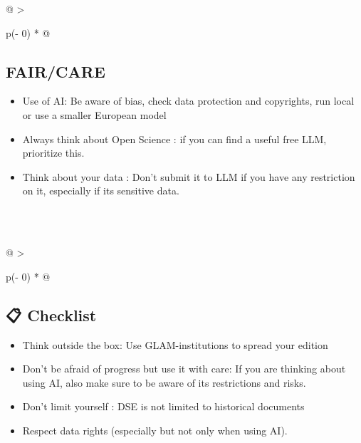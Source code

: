 \documentclass[
  letterpaper,
  DIV=11,
  numbers=noendperiod]{scrreprt}
\begin{document}
\begin{longtable}[]{@{}
  >{\raggedright\arraybackslash}p{(\columnwidth - 0\tabcolsep) * }@{}}
\toprule\noalign{}
\begin{minipage}[b]{\linewidth}\raggedright
\subsection{\texorpdfstring{\textbf{FAIR/CARE}}{FAIR/CARE}}\label{faircare-1}

\begin{itemize}
\item
  Use of AI: Be aware of bias, check data protection and copyrights, run
  local or use a smaller European model
\item
  Always think about Open Science : if you can find a useful free LLM,
  prioritize this.
\item
  Think about your data : Don't submit it to LLM if you have any
  restriction on it, especially if its sensitive data.
\end{itemize}
\end{minipage} \\
\midrule\noalign{}
\endhead
\bottomrule\noalign{}
\endlastfoot
 \\
\end{longtable}

\begin{longtable}[]{@{}
  >{\raggedright\arraybackslash}p{(\columnwidth - 0\tabcolsep) * }@{}}
\toprule\noalign{}
\begin{minipage}[b]{\linewidth}\raggedright
\subsection{\texorpdfstring{\textbf{📋
Checklist}}{📋 Checklist}}\label{checklist-1}

\begin{itemize}
\item
  Think outside the box: Use GLAM-institutions to spread your edition
\item
  Don't be afraid of progress but use it with care: If you are thinking
  about using AI, also make sure to be aware of its restrictions and
  risks.
\end{itemize}

\begin{itemize}
\item
  Don't limit yourself : DSE is not limited to historical documents
\item
  Respect data rights (especially but not only when using AI).
\end{itemize}
\end{minipage} \\
\midrule\noalign{}
\endhead
\bottomrule\noalign{}
\endlastfoot
 \\
\end{longtable}
\end{document}
